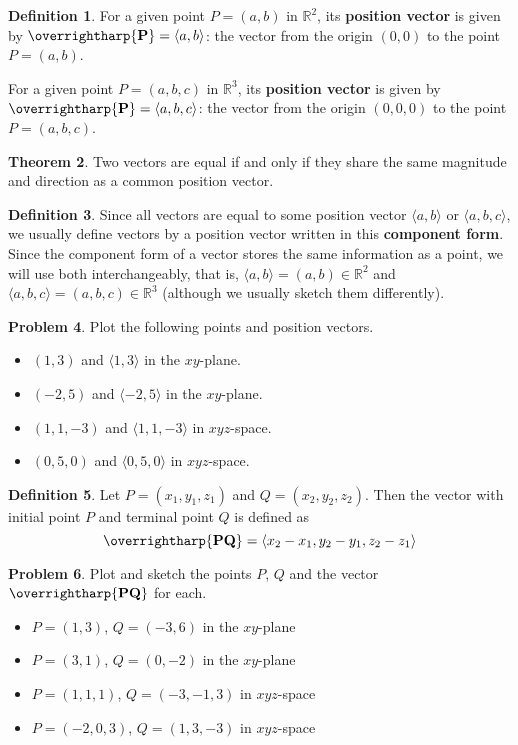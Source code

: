\documentclass[letterpaper, twoside, 12pt]{book}
\newcommand{\<}{\langle}
\renewcommand{\>}{\rangle}
\theoremstyle{definition}
\newtheorem{theorem}{Theorem}
\theoremstyle{definition}
\newtheorem{definition}[theorem]{Definition}
\newtheorem{problem}[theorem]{Problem}
\newcommand{\harpvec}[1]{\overrightharp{\ensuremath{\mathbf{#1}}}}
\newcommand*{\threevec}[3]{\ensuremath{\left\langle #1, #2, #3 \right\rangle}}
\begin{document}
\begin{definition}
  For a given point $P=(a,b)$ in $\mathbb{R}^2$, its \textbf{position vector}
  is given by $\harpvec{P}=\<a,b\>$: the vector from the origin $(0,0)$ to the
  point $P=(a,b)$.

  For a given point $P=(a,b,c)$ in $\mathbb{R}^3$, its \textbf{position vector}
  is given by $\harpvec{P}=\<a,b,c\>$: the vector from the origin $(0,0,0)$ to
  the point $P=(a,b,c)$.
\end{definition}

\begin{theorem}
  Two vectors are equal if and only if they share the same magnitude and
  direction as a common position vector.
\end{theorem}

\begin{definition}
  Since all vectors are equal to some position vector $\<a,b\>$ or $\<a,b,c\>$,
  we usually define vectors by a position vector written in this
  \textbf{component form}.
  Since the component form of a vector stores the same information as a point,
  we will use both interchangeably, that is, $\<a,b\>=(a,b)\in\mathbb{R}^2$ and
  $\<a,b,c\>=(a,b,c)\in\mathbb{R}^3$
  (although we usually sketch them differently).
\end{definition}

\begin{problem}
  Plot the following points and position vectors.
  \begin{itemize}
    \item $(1,3)$ and $\<1,3\>$ in the $xy$-plane.
    \item $(-2,5)$ and $\<-2,5\>$ in the $xy$-plane.
    \item $(1,1,-3)$ and $\<1,1,-3\>$ in $xyz$-space.
    \item $(0,5,0)$ and $\<0,5,0\>$ in $xyz$-space.
  \end{itemize}
\end{problem}

\vfill

\newpage

\begin{definition}
  Let $P = \left(x_1,y_1,z_1\right)$ and $Q = \left(x_2,y_2,z_2\right).$
  Then the vector with initial point $P$ and terminal point $Q$ is defined as
  \[
    \harpvec{PQ} = \threevec{x_2 - x_1}{y_2 - y_1}{z_2 - z_1}
  \]
\end{definition}

\begin{problem}
  Plot and sketch the points $P$, $Q$ and the vector $\harpvec{PQ}$ for each.
  \begin{itemize}
    \item $P=(1,3)$, $Q=(-3,6)$ in the $xy$-plane
    \item $P=(3,1)$, $Q=(0,-2)$ in the $xy$-plane
    \item $P=(1,1,1)$, $Q=(-3,-1,3)$ in $xyz$-space
    \item $P=(-2,0,3)$, $Q=(1,3,-3)$ in $xyz$-space
  \end{itemize}
\end{problem}
\end{document}
